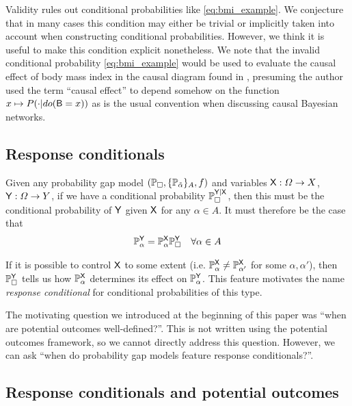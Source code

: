 Validity rules out conditional probabilities like \ref{eq:bmi_example}. We conjecture that in many cases this condition may either be trivial or implicitly taken into account when constructing conditional probabilities. However, we think it is useful to make this condition explicit nonetheless. We note that the invalid conditional probability \ref{eq:bmi_example} would be used to evaluate the causal effect of body mass index in the causal diagram found in \citet{shahar_association_2009}, presuming the author used the term ``causal effect'' to depend somehow on the function $x\mapsto P(\cdot|do(\mathsf{B}=x))$ as is the usual convention when discussing causal Bayesian networks.

\subsection{Response conditionals}

Given any probability gap model $(\mathbb{P}_\square,\{\mathbb{P}_{\tilde{\alpha}}\}_A,f)$ and variables $\mathsf{X}:\Omega\to X$, $\mathsf{Y}:\Omega\to Y$, if we have a conditional probability $\mathbb{P}_\square^{\mathsf{Y}|\mathsf{X}}$, then this must be the conditional probability of $\mathsf{Y}$ given $\mathsf{X}$ for any $\alpha\in A$. It must therefore be the case that
\begin{align}
    \mathbb{P}_\alpha^{\mathsf{Y}} &= \mathbb{P}_\alpha^{\mathsf{X}}\mathbb{P}_\square^{\mathsf{Y}}&\forall \alpha\in A
\end{align}

If it is possible to control $\mathsf{X}$ to some extent (i.e. $\mathbb{P}_\alpha^{\mathsf{X}}\neq\mathbb{P}_{\alpha'}^{\mathsf{X}}$ for some $\alpha,\alpha'$), then $\mathbb{P}_\square^{\mathsf{Y}}$ tells us how $\mathbb{P}_\alpha^{\mathsf{X}}$ determines its effect on $\mathbb{P}_\alpha^{\mathsf{Y}}$. This feature motivates the name \emph{response conditional} for conditional probabilities of this type.

The motivating question we introduced at the beginning of this paper was ``when are potential outcomes well-defined?''. This is not written using the potential outcomes framework, so we cannot directly address this question. However, we can ask ``when do probability gap models feature response conditionals?''.

\subsection{Response conditionals and potential outcomes}\label{sec:curry}

